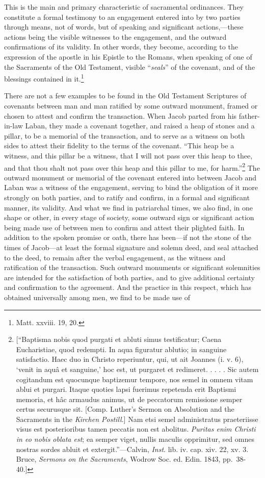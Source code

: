 \documentclass[]{book}
\begin{document}
This is the main and primary characteristic of sacramental ordinances. They constitute a formal testimony to an engagement entered into by two parties through means, not of words, but of speaking and significant actions,---these actions being the visible witnesses to the engagement, and the outward confirmations of its validity. In other words, they become, according to the expression of the apostle in his Epistle to the Romans, when speaking of one of the Sacraments of the Old Testament, visible ``\emph{seals}'' of the covenant, and of the blessings contained in it.\footnote{Matt. xxviii. 19, 20.}

There are not a few examples to be found in the Old Testament Scriptures of covenants between man and man ratified by some outward monument, framed or chosen to attest and confirm the transaction. When Jacob parted from his father-in-law Laban, they made a covenant together, and raised a heap of stones and a pillar, to be a memorial of the transaction, and to serve as a witness on both sides to attest their fidelity to the terms of the covenant. ``This heap be a witness, and this pillar be a witness, that I will not pass over this heap to thee, and that thou shalt not pass over this heap and this pillar to me, for harm.''\footnote{{[}``Baptisma nobis quod purgati et abluti simus testificatur; Caena Eucharistiae, quod redempti. In aqua figuratur ablutio; in sanguine satisfactio. Haec duo in Christo reperiuntur, qui, ut ait Joannes (i. v. 6), `venit in aquâ et sanguine,' hoc est, ut purgaret et redimeret. . . . . Sic autem cogitandum est quocunque baptizemur tempore, nos semel in omnem vitam ablui et purgari. Itaque quoties lapsi fuerimus repetenda erit Baptismi memoria, et hâc armaudus animus, ut de peccatorum remissione semper certus securusque sit. {[}Comp. Luther's Sermon on Absolution and the Sacraments in the \emph{Kirchen Postill}.{]} Nam etsi semel administratus praeteriisse visus est posterioribus tamen peccatis non est abolitus. \emph{Puritas enim Christi in eo nobis oblata est}; ea semper viget, nullis maculis opprimitur, sed omnes nostras sordes abluit et extergit.''---Calvin, \emph{Inst}. lib. iv. cap. xiv. 22, xv. 3. Bruce, \emph{Sermons on the Sacraments}, Wodrow Soc. ed. Edin. 1843, pp.~38-40.{]}} The outward monument or memorial of the covenant entered into between Jacob and Laban was a witness of the engagement, serving to bind the obligation of it more strongly on both parties, and to ratify and confirm, in a formal and significant manner, its validity. And what we find in patriarchal times, we also find, in one shape or other, in every stage of society, some outward sign or significant action being made use of between men to confirm and attest their plighted faith. In addition to the spoken promise or oath, there has been---if not the stone of the times of Jacob---at least the formal signature and solemn deed, and seal attached to the deed, to remain after the verbal engagement, as the witness and ratification of the transaction. Such outward monuments or significant solemnities are intended for the satisfaction of both parties, and to give additional certainty and confirmation to the agreement. And the practice in this respect, which has obtained universally among men, we find to be made use of 
\end{document}
